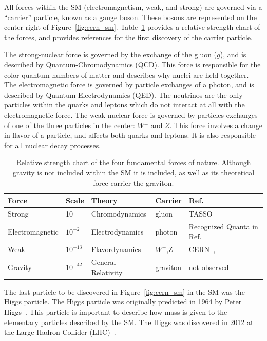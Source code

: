 All forces within the SM (electromagnetism, weak, and strong) are governed via a ``carrier'' particle, known as a gauge boson.
These bosons are represented on the center-right of Figure~\ref{fig:cern_sm}.
Table~\ref{table:forces} provides a relative strength chart of the forces, and provides references for the first discovery of the carrier particle.

The strong-nuclear force is governed by the exchange of the gluon ($g$), and is described by Quantum-Chromodynamics (QCD).
This force is responsible for the color quantum numbers of matter and describes why nuclei are held together.
The electromagnetic force is governed by particle exchanges of a photon, and is described by Quantum-Electrodynamics (QED).
The neutrinos are the only particles within the quarks and leptons which do not interact at all with the electromagnetic force.
The weak-nuclear force is governed by particles exchanges of one of the three particles in the center: $W^{\pm}$ and $Z$.
This force involves a change in flavor of a particle, and affects both quarks and leptons.
It is also responsible for all nuclear decay processes.

\begin{table}
\begin{center}
\begin{tabular}{||p{30mm} p{20mm} p{40mm} p{25mm} p{35mm}||}
 \hline
 Force & Scale & Theory & Carrier & Ref. \\ [0.5ex]
 \hline\hline
 Strong & 10 & Chromodynamics & gluon & TASSO~\citep{tasso_1978_BRANDELIK1979243, PETRA_PhysRevLett.43.830} \\
 \hline
 Electromagnetic & $10^{-2} $ & Electrodynamics & photon & Recognized Quanta in Ref.~\citep{https://doi.org/10.1002/andp.19053220607} \\
 \hline
 Weak & $10^{-13}$ & Flavordynamics & $W^{\pm}$,Z & CERN~\citep{wboson_measure_ARNISON1983103},\citep{zboson_measure_1983398}\\
 \hline
 Gravity & $10^{-42}$ & General Relativity & graviton  & not observed \\
 \hline
 \hline
\end{tabular}
\caption{Relative strength chart of the four fundamental forces of nature. 
Although gravity is not included within the SM it is included, as well as its theoretical force carrier the graviton.
}
\label{table:forces}
\end{center}
\end{table}

The last particle to be discovered in Figure~\ref{fig:cern_sm} in the SM was the Higgs particle.
The Higgs particle was originally predicted in 1964 by Peter Higgs~\citep{HIGGS1964132}.
This particle is important to describe how mass is given to the elementary particles described by the SM.
The Higgs was discovered in 2012 at the Large Hadron Collider (LHC)~\citep{higgs_discovery_20121}.

